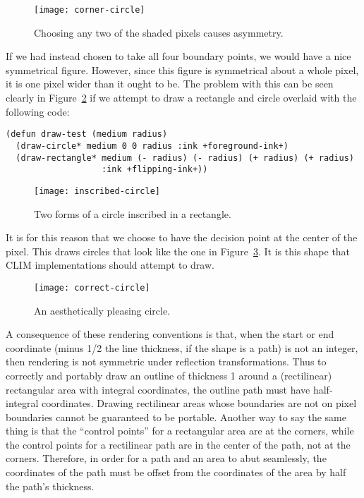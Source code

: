 \begin{figure}
\centerline{\texttt{[image: corner-circle]}}
\caption{\label{corner-circle} Choosing any two of the shaded pixels causes asymmetry.}
\end{figure}

If we had instead chosen to take all four boundary points, we would have a nice
symmetrical figure.  However, since this figure is symmetrical about a whole
pixel, it is one pixel wider than it ought to be.  The problem with this can be
seen clearly in Figure~\ref{inscribed-circle} if we attempt to draw a rectangle
and circle overlaid with the following code:

\begin{verbatim}
(defun draw-test (medium radius)
  (draw-circle* medium 0 0 radius :ink +foreground-ink+)
  (draw-rectangle* medium (- radius) (- radius) (+ radius) (+ radius)
                   :ink +flipping-ink+))
\end{verbatim}

\begin{figure}
\centerline{\texttt{[image: inscribed-circle]}}
\caption{\label{inscribed-circle} Two forms of a circle inscribed in a rectangle.}
\end{figure}

It is for this reason that we choose to have the decision point at the center of
the pixel.  This draws circles that look like the one in
Figure~\ref{correct-circle}.  It is this shape that CLIM implementations should
attempt to draw.

\begin{figure}
\centerline{\texttt{[image: correct-circle]}}
\caption{\label{correct-circle} An aesthetically pleasing circle.}
\end{figure}

A consequence of these rendering conventions is that, when the start or end
coordinate (minus 1/2 the line thickness, if the shape is a path) is not an
integer, then rendering is not symmetric under reflection transformations.  Thus
to correctly and portably draw an outline of thickness 1 around a (rectilinear)
rectangular area with integral coordinates, the outline path must have
half-integral coordinates.  Drawing rectilinear areas whose boundaries are not
on pixel boundaries cannot be guaranteed to be portable.  Another way to say the
same thing is that the ``control points'' for a rectangular area are at the
corners, while the control points for a rectilinear path are in the center of
the path, not at the corners.  Therefore, in order for a path and an area to
abut seamlessly, the coordinates of the path must be offset from the coordinates
of the area by half the path's thickness.

